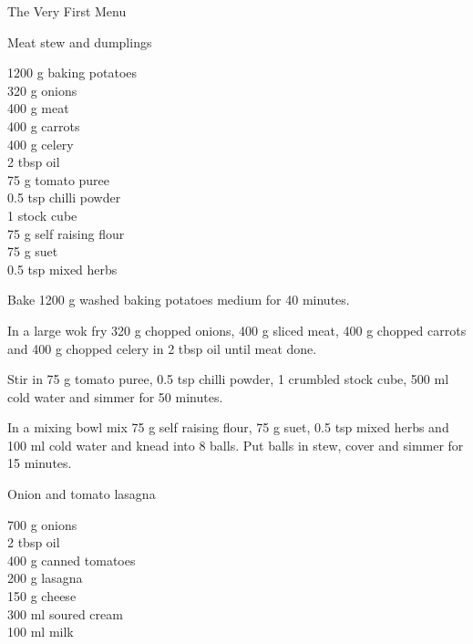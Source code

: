 \begin{menu}{The Very First Menu}
\begin{recipe}{2}{Meat stew and dumplings}
		\begin{ingredients}
		1200 g baking potatoes  \\
	320 g onions  \\
	400 g meat  \\
	400 g carrots  \\
	400 g celery  \\
	2 tbsp oil  \\
	75 g tomato puree  \\
	0.5 tsp chilli powder  \\
	1  stock cube  \\
	75 g self raising flour  \\
	75 g suet  \\
	0.5 tsp mixed herbs  \\
	
		\end{ingredients}
	
    \begin{instructions}
    \item 
      Bake 1200 g washed baking potatoes 
      medium for 40 minutes.
    \item 
				In a large wok fry
				320 g chopped onions,
				400 g sliced meat,
				400 g chopped carrots
				and
				400 g chopped celery
				in
				2 tbsp  oil
				until meat done.
			\item 
				Stir in
				75 g  tomato puree,
				0.5 tsp  chilli powder,
				1  crumbled stock cube,
				500 ml  cold water
				and simmer for 50 minutes.
			\item 
				In a mixing bowl mix
				75 g  self raising flour,
				75 g  suet,
				0.5 tsp  mixed herbs
				and
				100 ml  cold water
				and knead into 8 balls.
				Put balls in stew, cover and
				simmer for 15 minutes.
			
    \end{instructions}
    \end{recipe}%
  
    \begin{recipe}{2}{Onion and tomato lasagna}%
    
	
		\begin{ingredients}
		700 g onions  \\
	2 tbsp oil  \\
	400 g canned tomatoes  \\
	200 g lasagna  \\
	150 g cheese  \\
	300 ml soured cream  \\
	100 ml milk  \\
	

\end{ingredients}
\end{recipe}
\end{menu}
